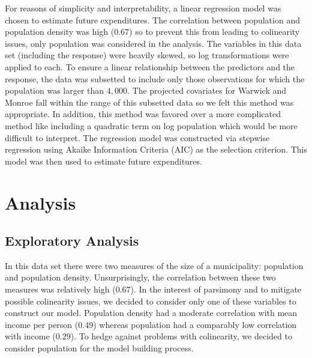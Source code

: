 \documentclass{article}\usepackage[]{graphicx}\usepackage[]{color}
\begin{document}
For reasons of simplicity and interpretability, a linear regression model was chosen to estimate future expenditures. The correlation between population and population density was high ($0.67$) so to prevent this from leading to colinearity issues, only population was considered in the analysis. The variables in this data set (including the response) were heavily skewed, so log transformations were applied to each. To ensure a linear relationship between the predictors and the response, the data was subsetted to include only those observations for which the population was larger than $4,000$. The projected covariates for Warwick and Monroe fall within the range of this subsetted data so we felt this method was appropriate. In addition, this method was favored over a more complicated method like including a quadratic term on log population which would be more difficult to interpret. The regression model was constructed via stepwise regression using Akaike Information Criteria (AIC) as the selection criterion. This model was then used to estimate future expenditures.


\section{Analysis} \label{analysis}




\subsection{Exploratory Analysis} \label{eda}

In this data set there were two measures of the size of a municipality: population and population density. Unsurprisingly, the correlation between these two measures was relatively high ($0.67$). In the interest of parsimony and to mitigate possible colinearity issues, we decided to consider only one of these variables to construct our model. Population density had a moderate correlation with mean income per person ($0.49$) whereas population had a comparably low correlation with income ($0.29$). To hedge against problems with colinearity, we decided to consider population for the model building process.
\end{document}
